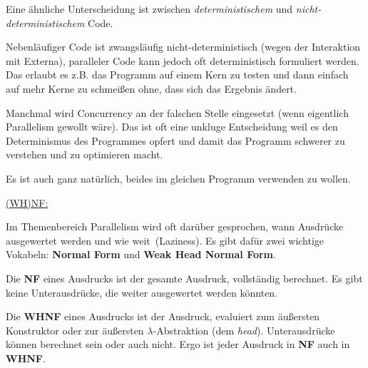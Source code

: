 \documentclass{beamer}
\begin{document}

\begin{frame}
Eine ähnliche Unterscheidung ist zwischen \emph{deterministischem} und \emph{nicht-deterministischem} Code.\smallskip\pause

Nebenläufiger Code ist zwangsläufig nicht-deterministisch (wegen der Interaktion mit Externa), paralleler Code kann jedoch oft deterministisch formuliert werden. Das erlaubt es z.B. das Programm auf einem Kern zu testen und dann einfach auf mehr Kerne zu schmeißen ohne, dass sich das Ergebnis ändert.\bigskip\pause

Manchmal wird Concurrency an der falschen Stelle eingesetzt (wenn eigentlich Parallelism gewollt wäre). Das ist oft eine unkluge Entscheidung weil es den Determinismus des Programmes opfert und damit das Programm schwerer zu verstehen und zu optimieren macht.\pause\smallskip

Es ist auch ganz natürlich, beides im gleichen Programm verwenden zu wollen.
\end{frame}


\begin{frame}
\underline{(WH)NF:}\smallskip

Im Themenbereich Parallelism wird oft darüber gesprochen, wann Ausdrücke ausgewertet werden und \glqq wie weit\grqq\ (Laziness). Es gibt dafür zwei wichtige Vokabeln:
\textbf{Normal Form} und \textbf{Weak Head Normal Form}.\bigskip\pause

Die \textbf{NF} eines Ausdrucks ist der gesamte Ausdruck, vollständig berechnet. Es gibt keine Unterausdrücke, die weiter ausgewertet werden könnten.\bigskip\pause

Die \textbf{WHNF} eines Ausdrucks ist der Ausdruck, evaluiert zum äußersten Konstruktor oder zur äußersten $\lambda$-Abstraktion (dem \emph{head}). Unterausdrücke können berechnet sein oder auch nicht. Ergo ist jeder Ausdruck in \textbf{NF} auch in \textbf{WHNF}.
\end{frame}
\end{document}
